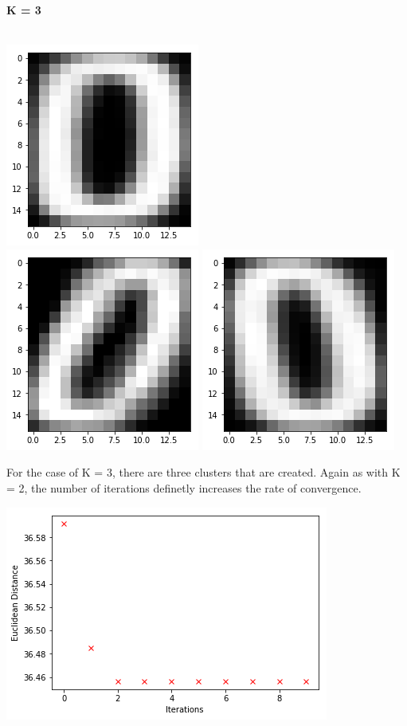 \documentclass[a4paper]{article}
\begin{document}
{\newpage
\textbf{\large K = 3} \\ \\
\begin{center}
\includegraphics[scale=.85]{./k3_1.png}  \\
\includegraphics[scale=.85]{./k3_2.png}  
\includegraphics[scale=.85]{./k3_3.png}  \\
\end{center}
For the case of K = 3, there are three clusters that are created. Again as with K = 2, the number of iterations definetly increases the rate of convergence. 
\begin{center}
 \includegraphics[scale=.80]{./k3plt.png} \\

\end{center}}
\end{document}
